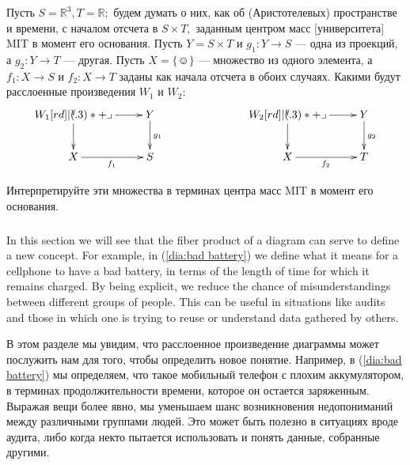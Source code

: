 \documentclass[../main/CT4S-EN-RU]{subfiles}
\begin{document}
\begin{exerciseRUS}
Пусть $S={ℝ}^3, T={ℝ};$ будем думать о них, как об (Аристотелевых) пространстве и времени, с началом отсчета в $S\times T,$ заданным центром масс [университета] MIT в момент его основания. Пусть $Y=S\times T$ и $g_1\colon Y{→} S$ — одна из проекций, а $g_2\colon Y{→} T$ — другая. Пусть $X={\{☺\}}$ — множество из одного элемента, а $f_1\colon X{→} S$ и $f_2\colon X{→} T$ заданы как начала отсчета в обоих случаях. 
\sexc Какими будут расслоенные произведения $W_1$ и $W_2$:
$$
\xymatrix{W_1\ar[r]\ar[d]\ullimit&Y\ar[d]^{g_1}\\X\ar[r]_{f_1}&S}\hspace{1in}
\xymatrix{W_2\ar[r]\ar[d]\ullimit&Y\ar[d]^{g_2}\\X\ar[r]_{f_2}&T}
$$
\item Интерпретируйте эти множества в терминах центра масс MIT в момент его основания.
\endsexc
\end{exerciseRUS}


\subsubsection{}

\begin{blockENG}
In this section we will see that the fiber product of a diagram can serve to define a new concept. For example, in (\ref{dia:bad battery}) we define what it means for a cellphone to have a bad battery, in terms of the length of time for which it remains charged. By being explicit, we reduce the chance of misunderstandings between different groups of people. This can be useful in situations like audits and those in which one is trying to reuse or understand data gathered by others.
\end{blockENG}

\begin{blockRUS}
В этом разделе мы увидим, что расслоенное произведение диаграммы может послужить нам для того, чтобы определить новое понятие. Например, в (\ref{dia:bad battery}) мы определяем, что такое мобильный телефон с плохим аккумулятором, в терминах продолжительности времени, которое он остается заряженным. Выражая вещи более явно, мы уменьшаем шанс возникновения недопониманий между различными группами людей. Это может быть полезно в ситуациях вроде аудита, либо когда некто пытается использовать и понять данные, собранные другими.
\end{blockRUS}
\end{document}
